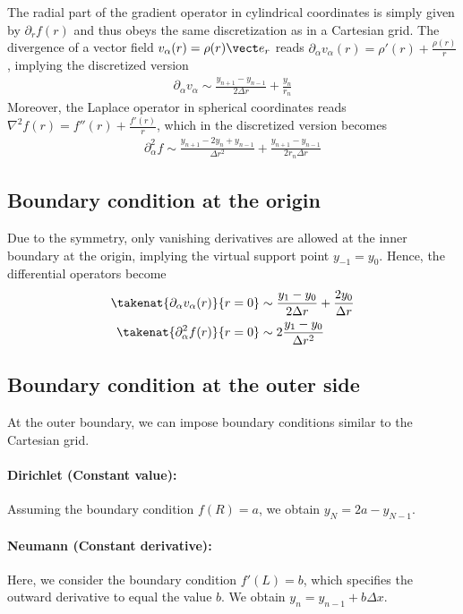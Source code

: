\documentclass[
	superscriptaddress,
	twocolumn,
	aps, pre
]{revtex4-1}
\newcommand{\dx}{\Delta x}
\newcommand{\dr}{\Delta r}
\begin{document}
The radial part of the gradient operator in cylindrical coordinates is simply given by $\partial_r f(r)$ and thus obeys the same discretization as in a Cartesian grid.
The divergence of a vector field $v_\alpha(r) = \rho(r) \vect e_r$ reads
$\partial_\alpha v_\alpha(r) =  \rho'(r) + \frac{\rho(r)}{r}$, implying the discretized version
\begin{align}
	\partial_\alpha v_\alpha \sim
		\frac{y_{n+1} - y_{n-1}}{2\dr}
		+ \frac{y_n}{r_n}
\end{align}
Moreover, the Laplace operator in spherical coordinates reads $\nabla^2 f(r) = f''(r) + \frac{f'(r)}{r}$, which in the discretized version becomes
\begin{align}
	\partial_\alpha^2 f \sim
		\frac{y_{n+1} - 2 y_n + y_{n-1}}{\dr^2}
		+ \frac{y_{n+1} - y_{n-1}}{2 r_n \dr}
\end{align}

\subsection{Boundary condition at the origin}
Due to the symmetry, only vanishing derivatives are allowed at the inner boundary at the origin, implying the virtual support point $y_{-1} = y_0$.
Hence, the differential operators become
\begin{subequations}
\begin{align}
	\takenat{\partial_\alpha v_\alpha(r)}{r=0} &\sim
		\frac{y_1 - y_0}{2\dr}
		+ \frac{2y_0}{\dr}
\\
	\takenat{\partial_\alpha^2 f(r)}{r=0} &\sim
		2\frac{y_1 - y_0}{\dr^2}
\end{align}
\end{subequations}


\subsection{Boundary condition at the outer side}
At the outer boundary, we can impose boundary conditions similar to the Cartesian grid.

\paragraph{Dirichlet (Constant value):}
Assuming the boundary condition $f(R) = a$, we obtain $y_N = 2a - y_{N-1}$.

\paragraph{Neumann (Constant derivative):}
Here, we consider the boundary condition $f'(L) = b$, which specifies the outward derivative to equal the value $b$.
We obtain $y_n = y_{n-1} + b \dx$.
\end{document}
